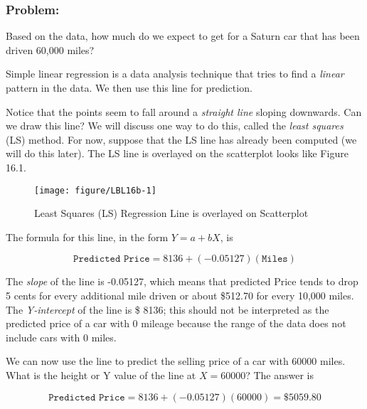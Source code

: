 \documentclass[11pt]{book}\usepackage[]{graphicx}\usepackage[]{color}
\begin{document}
\subsubsection{Problem:}

Based on the data, how much do we expect to get for a Saturn car that has been driven 60,000 miles?

Simple linear regression is a data analysis technique that tries to find a \textit{linear} pattern in the data.  We then use this line for prediction.

Notice that the points seem to fall around a \textit{straight line} sloping downwards.  Can we draw this line?  We will discuss one way to do this, called the \textit{least squares} (LS) method.  For now, suppose that the LS line has already been computed (we will do this later).  The LS line is overlayed on the scatterplot looks like Figure 16.1.

\begin{figure}[ht]
\centering
\caption{Least Squares (LS) Regression Line is overlayed on Scatterplot}



{\centering \texttt{[image: figure/LBL16b-1]} 

}




\end{figure}

The formula for this line, in the form $Y= a + bX$,  is 

\begin{equation*}
  \texttt{Predicted Price} = 8136 + (-0.05127)(\texttt{Miles})
\end{equation*}

The \textit{slope} of the line is -0.05127, which means that predicted Price tends to drop 5 cents for every additional mile driven or about \$512.70 for every 10,000 miles. The \textit{Y-intercept} of the line is \$ 8136; this should not be interpreted as the predicted price of a car with 0 mileage because the range of the data does not include cars with 0 miles.  

We can now use the line to predict the selling price of a car with 60000 miles.  What is the height or Y value of the line at $X = 60000$?  The answer is

\begin{equation*}
  \texttt{Predicted Price} = 8136 + (-0.05127)(60000) = \$5059.80
\end{equation*}
\end{document}

